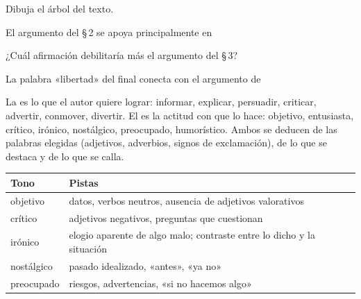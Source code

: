 \taller
{}
\begin{ejercicios}
\item Dibuja el árbol del texto. 
\end{ejercicios}
\begin{ejercicios}
\item El argumento del \S\,2 se apoya principalmente en
\item ¿Cuál afirmación debilitaría más el argumento del \S\,3?
\item La palabra «libertad» del final conecta con el argumento de
\end{ejercicios}

\bitacora


La  es lo que el autor quiere lograr: informar, explicar, persuadir, criticar, advertir, conmover,
divertir. El  es la actitud con que lo hace: objetivo, entusiasta, crítico, irónico, nostálgico, preocupado,
humorístico. Ambos se deducen de las palabras elegidas (adjetivos, adverbios, signos de exclamación), de lo que se destaca y
de lo que se calla.

\begin{center}\small
\begin{tabularx}{\linewidth}{@{}l>{\raggedright\arraybackslash}X@{}}
\toprule
\textbf{Tono} & \textbf{Pistas}\\\midrule
objetivo & datos, verbos neutros, ausencia de adjetivos valorativos\\
crítico & adjetivos negativos, preguntas que cuestionan\\
irónico & elogio aparente de algo malo; contraste entre lo dicho y la situación\\
nostálgico & pasado idealizado, «antes», «ya no»\\
preocupado & riesgos, advertencias, «si no hacemos algo»\\\bottomrule
\end{tabularx}
\end{center}

